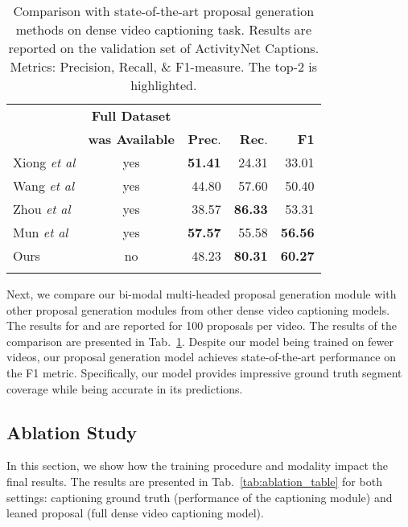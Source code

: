 \documentclass{src/bmvc2k}
\def\etal{\emph{et al}\bmvaOneDot}
\begin{document}
\begin{table}
\begin{minipage}[c]{0.55\textwidth}
\centering
\small
\setlength\tabcolsep{0.5em}
\clearpage{}\begin{tabular}{lc rrr}
\toprule
& \textbf{Full Dataset} & & & \\
& \textbf{was Available} & \textbf{Prec}. & \textbf{Rec}. & \textbf{F1} \\
\midrule
Xiong \etal \cite{MFT_Xiong2018} & yes & \textbf{51.41} & 24.31 & 33.01 \\
Wang \etal \cite{bafcg_Wang2018n} & yes  & 44.80 & 57.60 & 50.40 \\
Zhou \etal \cite{masked_transformer_Zhou2018} & yes & 38.57 & \textbf{86.33} & 53.31 \\
Mun \etal \cite{Streamlined_Mun2019} & yes & \textbf{57.57} & 55.58 & \textbf{56.56} \\
Ours & no & 48.23 & \textbf{80.31} & \textbf{60.27} \\
\bottomrule
\vspace{0ex}
\end{tabular}\clearpage{}
\end{minipage}\hfill
\begin{minipage}[c]{0.38\textwidth}
\caption{Comparison with state-of-the-art proposal generation methods on dense video captioning task. Results are reported on the validation set of ActivityNet Captions. Metrics: Precision, Recall, \& F1-measure. The top-2 is highlighted. \label{tab:proposal_gen_results}}
\end{minipage}
\vspace{-3ex}
\end{table}

Next, we compare our bi-modal multi-headed proposal generation module with other proposal generation modules from other dense video captioning models. The results for \cite{masked_transformer_Zhou2018} and \cite{bafcg_Wang2018n} are reported for 100 proposals per video. The results of the comparison are presented in Tab.~\ref{tab:proposal_gen_results}. Despite our model being trained on fewer videos, our proposal generation model achieves state-of-the-art performance on the F1 metric. Specifically, our model provides impressive ground truth segment coverage while being accurate in its predictions.

\subsection{Ablation Study \label{sec:ablation_studies}}
In this section, we show how the training procedure and modality impact the final results. The results are presented in Tab.~\ref{tab:ablation_table} for both settings: captioning ground truth (performance of the captioning module) and leaned proposal (full dense video captioning model).\vspace{-2ex}
\end{document}
